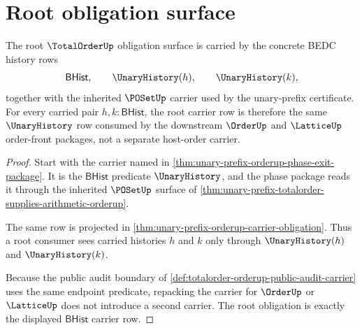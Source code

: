 \section{Root obligation surface}
\label{sec:totalorder-root-obligation-surface}

\begin{theorem}
\label{thm:totalorder-root-carrier-obligation}
The root $\TotalOrderUp$ obligation surface is carried by the concrete BEDC
history rows
$$
\mathsf{BHist},\qquad \UnaryHistory(h),\qquad \UnaryHistory(k),
$$
together with the inherited $\POSetUp$ carrier used by the unary-prefix
certificate. For every carried pair $h,k:\mathsf{BHist}$, the root carrier row
is therefore the same $\UnaryHistory$ row consumed by the downstream
$\OrderUp$ and $\LatticeUp$ order-front packages, not a separate host-order
carrier.
\end{theorem}
\begin{proof}
Start with the carrier named in
\autoref{thm:unary-prefix-orderup-phase-exit-package}. It is the
$\mathsf{BHist}$ predicate $\UnaryHistory$, and the phase package reads it
through the inherited $\POSetUp$ surface of
\autoref{thm:unary-prefix-totalorder-supplies-arithmetic-orderup}.

The same row is projected in
\autoref{thm:unary-prefix-orderup-carrier-obligation}. Thus a root consumer
sees carried histories $h$ and $k$ only through $\UnaryHistory(h)$ and
$\UnaryHistory(k)$.

Because the public audit boundary of
\autoref{def:totalorder-orderup-public-audit-carrier} uses the same endpoint
predicate, repacking the carrier for $\OrderUp$ or $\LatticeUp$ does not
introduce a second carrier. The root obligation is exactly the displayed
$\mathsf{BHist}$ carrier row.
\end{proof}

